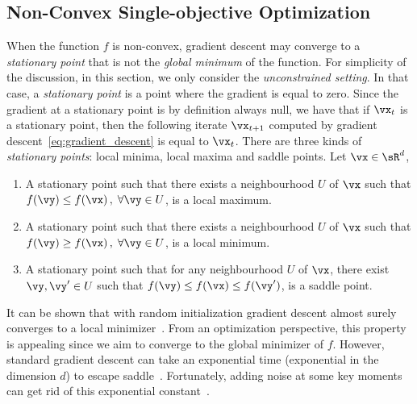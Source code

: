 






\subsection{Non-Convex Single-objective Optimization}

\label{sec:non-convex}




When the function $f$ is non-convex, gradient descent may converge to a \emph{stationary point} that is not the \emph{global minimum} of the function. For simplicity of the discussion, in this section, we only consider the \emph{unconstrained setting}. In that case, a \emph{stationary point} is a point where the gradient is equal to zero. Since the gradient at a stationary point is by definition always null, we have that if $\vx_t$ is a stationary point, then the following iterate $\vx_{t+1}$ computed by gradient descent~\eqref{eq:gradient_descent} is equal to $\vx_t$. There are three kinds of \emph{stationary points}: local minima, local maxima and saddle points. Let $\vx \in \sR^d$,

\begin{enumerate}
\item A stationary point such that there exists a neighbourhood $U$ of $\vx$ such that $f(\vy) \leq f(\vx) \,, \; \forall \vy \in U$, is a local maximum.
\item A stationary point such that there exists a neighbourhood $U$ of $\vx$ such that $f(\vy) \geq f(\vx) \,, \; \forall \vy \in U$, is a local minimum.
\item A stationary point such that for any neighbourhood $U$ of $\vx$, there exist $\vy,\vy' \in U$ such that $f(\vy) \leq f(\vx) \leq f(\vy')$, is a saddle point.
\end{enumerate}

It can be shown that with random initialization gradient descent almost surely converges to a local minimizer~\citep{lee2016gradient}. From an optimization perspective, this property is appealing since we aim to converge to the global minimizer of $f$. However, standard gradient descent can take an exponential time (exponential in the dimension $d$) to escape saddle~\citep{du2017gradient}. Fortunately, adding noise at some key moments can get rid of this exponential constant~\citep{jin2017escape}.










